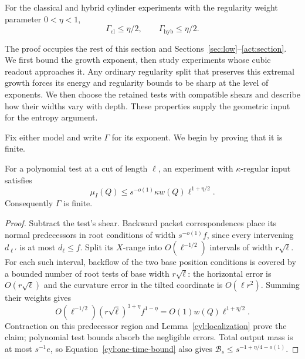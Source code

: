 \begin{theorem}\label{thm:cylinder}
For the classical and hybrid cylinder experiments with the
regularity weight parameter $0<\eta<1$,
\[
 \Gamma_{\mathrm{cl}}\le\eta/2,
 \qquad \Gamma_{\mathrm{hyb}}\le\eta/2.
\]
\end{theorem}

The proof occupies the rest of this section and
Sections~\ref{sec:low}--\ref{act:section}. We first bound the growth
exponent, then study experiments whose cubic readout approaches it.
Any ordinary regularity split that preserves this extremal growth forces its
energy and regularity bounds to be sharp at the level of exponents.
We then choose the retained tests with compatible shears and describe
how their widths vary with depth. These properties supply the geometric
input for the entropy argument.

Fix either model and write $\Gamma$ for its exponent. We begin by proving
that it is finite.

\begin{lemma}\label{cyl:one-time}
For a polynomial test at a cut of length $\ell$, an experiment with
$\kappa$-regular input satisfies
\begin{equation}\label{cyl:one-time-bound}
 \mu_I(Q)\le s^{-o(1)}\kappa w(Q)\ell^{1+\eta/2}.
\end{equation}
Consequently $\Gamma$ is finite.
\end{lemma}

\begin{proof}
Subtract the test's shear.  Backward packet correspondences place its
normal predecessors in root conditions of width $s^{-o(1)}f$, since
every intervening $d_{\ell'}$ is at most $d_\ell\le f$.  Split its
$X$-range into $O(\ell^{-1/2})$ intervals of width $r\sqrt\ell$.
For each such interval, backflow of the two base position conditions is
covered by a bounded number of root tests of base width $r\sqrt\ell$:
the horizontal error is $O(r\sqrt\ell)$ and the curvature error in the
tilted coordinate is $O(\ell r^2)$.  Summing their weights gives
\[
 O(\ell^{-1/2})(r\sqrt\ell)^{3+\eta}f^{1-\eta}
       =O(1)w(Q)\ell^{1+\eta/2}.
\]
Contraction on this predecessor region and
Lemma~\ref{cyl:localization} prove the claim; polynomial test bounds
absorb the negligible errors.  Total output mass is at most $s^{-1}e$,
so Equation~\eqref{cyl:one-time-bound} also gives
$\mathcal B_s\le s^{-1+\eta/4-o(1)}$.
\end{proof}

